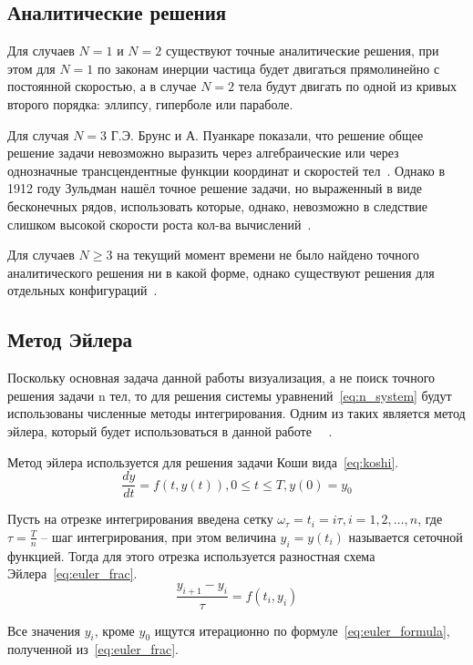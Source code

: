 \subsection*{Аналитические решения}
Для случаев $N = 1$ и $N = 2$ существуют точные аналитические решения, при этом для $N = 1$ по законам инерции частица будет двигаться прямолинейно с постоянной скоростью, а в случае $N = 2$ тела будут двигать по одной из кривых второго порядка: эллипсу, гиперболе или параболе.

Для случая $N = 3$ Г.Э. Брунс и А. Пуанкаре показали, что решение общее решение задачи невозможно выразить через алгебраические или через однозначные трансцендентные функции координат и скоростей тел~\cite{markeev}. Однако в 1912 году Зульдман нашёл точное решение задачи, но выраженный в виде бесконечных рядов, использовать которые, однако, невозможно в следствие слишком высокой скорости роста кол-ва вычислений~\cite{markeev}.

Для случаев $N \geq 3$ на текущий момент времени не было найдено точного аналитического решения ни в какой форме, однако существуют решения для отдельных конфигураций~\cite{solution3}.

\subsection*{Метод Эйлера}
Поскольку основная задача данной работы визуализация, а не поиск точного решения задачи n тел, то для решения системы уравнений~\ref{eq:n_system} будут использованы численные методы интегрирования. Одним из таких является метод эйлера, который будет использоваться в данной работе ~\cite{nbody-numeric}~\cite{samarskii}.

Метод эйлера используется для решения задачи Коши вида~\ref{eq:koshi}.
\begin{equation}
	\label{eq:koshi}
	\frac{dy}{dt} = f(t, y(t)), 0 \leq t \leq T, y(0) = y_0
\end{equation}

Пусть на отрезке интегрирования введена сетку $\omega_\tau = {t_i = i\tau, i = 1,2,\dots, n}$, где $\tau = \frac{T}{n}$ -- шаг интегрирования, при этом величина $y_i = y(t_i)$ называется сеточной функцией.
Тогда для этого отрезка используется разностная схема Эйлера~\ref{eq:euler_frac}.
\begin{equation}
	\label{eq:euler_frac}
	\frac{y_{i+1} - y_i}{\tau} = f(t_i, y_i)
\end{equation}

Все значения $y_i$, кроме $y_0$ ищутся итерационно по формуле~\ref{eq:euler_formula}, полученной из~\ref{eq:euler_frac}.

